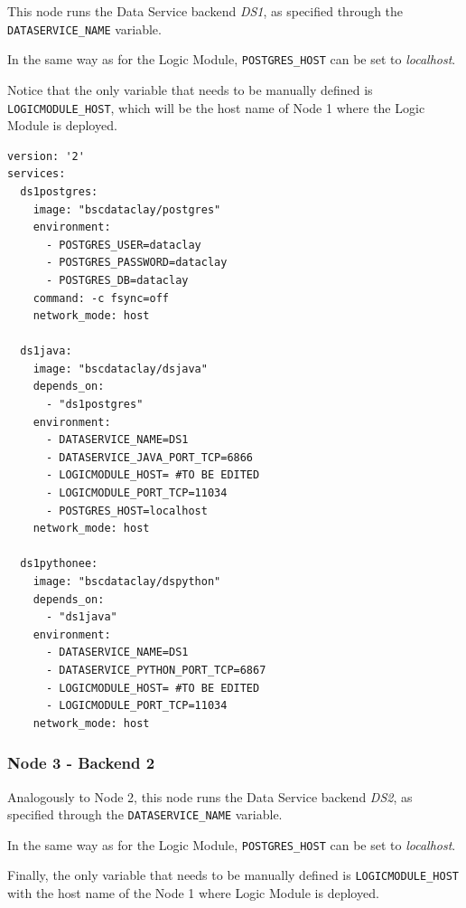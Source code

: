 This node runs the Data Service backend \textit{DS1}, as specified through the \texttt{DATASERVICE\_NAME} variable.

In the same way as for the Logic Module, \texttt{POSTGRES\_HOST} can be set to \textit{localhost}.

Notice that the only variable that needs to be manually defined is \texttt{LOGICMODULE\_HOST}, which will be the host name of Node 1 where the Logic Module is deployed.

\begin{tBox}
 \begin{lstlisting}[language=docker-compose-2, frame=none]
version: '2'
services:
  ds1postgres:
    image: "bscdataclay/postgres"
    environment:
      - POSTGRES_USER=dataclay
      - POSTGRES_PASSWORD=dataclay
      - POSTGRES_DB=dataclay
    command: -c fsync=off
    network_mode: host

  ds1java:
    image: "bscdataclay/dsjava"
    depends_on:
      - "ds1postgres"
    environment:
      - DATASERVICE_NAME=DS1
      - DATASERVICE_JAVA_PORT_TCP=6866
      - LOGICMODULE_HOST= #TO BE EDITED
      - LOGICMODULE_PORT_TCP=11034
      - POSTGRES_HOST=localhost
    network_mode: host

  ds1pythonee:
    image: "bscdataclay/dspython"
    depends_on:
      - "ds1java"
    environment:
      - DATASERVICE_NAME=DS1
      - DATASERVICE_PYTHON_PORT_TCP=6867
      - LOGICMODULE_HOST= #TO BE EDITED
      - LOGICMODULE_PORT_TCP=11034
    network_mode: host
 \end{lstlisting}
\end{tBox}

\subsubsection{Node 3 - Backend 2}

Analogously to Node 2, this node runs the Data Service backend \textit{DS2}, as specified through the \texttt{DATASERVICE\_NAME} variable.

In the same way as for the Logic Module, \texttt{POSTGRES\_HOST} can be set to \textit{localhost}.

Finally, the only variable that needs to be manually defined is \texttt{LOGICMODULE\_HOST} with the host name of the Node 1 where Logic Module is deployed.

